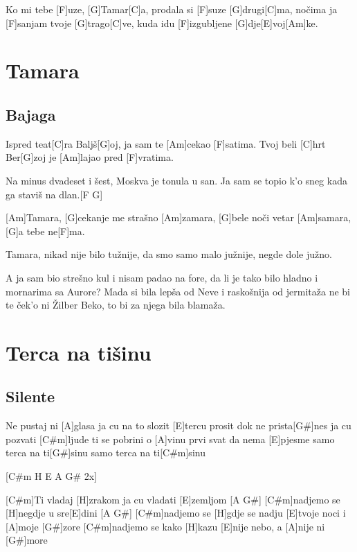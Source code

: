 \documentclass[a4paper,12pt]{article}
\begin{document}
\begin{multicols}{2}
\begin{guitar}
Ko mi tebe [F]uze, [G]Tamar[C]a, 
prodala si [F]suze [G]drugi[C]ma, 
nočima ja [F]sanjam tvoje [G]trago[C]ve, 
kuda idu [F]izgubljene [G]dje[E]voj[Am]ke. 

\end{guitar}
\section{Tamara}
\subsection*{Bajaga}
\begin{guitar}

Ispred teat[C]ra Baljš[G]oj,
ja sam te [Am]cekao [F]satima.
Tvoj beli [C]hrt Ber[G]zoj 
je [Am]lajao pred [F]vratima.


Na minus dvadeset i šest,
Moskva je tonula u san.
Ja sam se topio k'o sneg 
kada ga staviš na dlan.[F G]


[Am]Tamara,
[G]cekanje me strašno [Am]zamara,
[G]bele noči vetar [Am]samara,
[G]a tebe ne[F]ma.


Tamara,
nikad nije bilo tužnije,
da smo samo malo južnije,
negde dole južno.


A ja sam bio strešno kul 
i nisam padao na fore,
da li je tako bilo hladno 
i mornarima sa Aurore? 
Mada si bila lepša od Neve
i raskošnija od jermitaža 
ne bi te ček'o ni Žilber Beko,
to bi za njega bila blamaža.

\end{guitar}
\section{Terca na tišinu}
\subsection*{Silente}
\begin{guitar}
[C#m]Ne pustaj ni [A]glasa
ja cu na to slozit [E]tercu
prosit dok ne prista[G#]nes
ja cu pozvati [C#m]ljude
ti se pobrini o [A]vinu
prvi svat da nema [E]pjesme
samo terca na ti[G#]sinu
samo terca na ti[C#m]sinu



[C#m H E A G# 2x]



[C#m]Ti vladaj [H]zrakom
ja cu vladati [E]zemljom [A  G#]
[C#m]nadjemo se [H]negdje u sre[E]dini [A  G#]
[C#m]nadjemo se [H]gdje se nadju
[E]tvoje noci i [A]moje [G#]zore
[C#m]nadjemo se kako [H]kazu
[E]nije nebo, a [A]nije ni [G#]more




\end{guitar}
\end{multicols}
\end{document}
